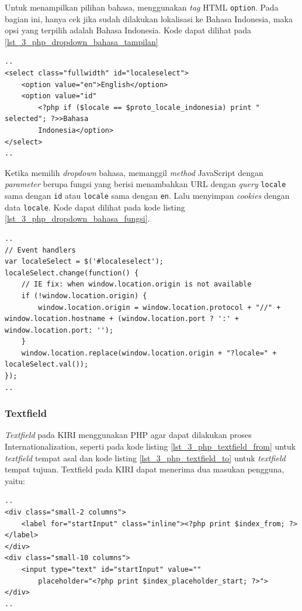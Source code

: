 Untuk menampilkan pilihan bahasa, menggunakan \textit{tag} HTML \verb!option!. Pada bagian ini, hanya cek jika sudah dilakukan lokalisasi ke Bahasa Indonesia, maka opsi yang terpilih adalah Bahasa Indonesia. Kode dapat dilihat pada \ref{lst_3_php_dropdown_bahasa_tampilan}

\begin{lstlisting}[caption=Menampilkan pilihan bahasa kepada pengguna ,label = {lst_3_php_dropdown_bahasa_tampilan}]
..
<select class="fullwidth" id="localeselect">
	<option value="en">English</option>
	<option value="id"
		<?php if ($locale == $proto_locale_indonesia) print " selected"; ?>>Bahasa
		Indonesia</option>
</select>
..
\end{lstlisting}

Ketika memilih \textit{dropdown} bahasa, memanggil \textit{method} JavaScript dengan \textit{parameter} berupa fungsi yang berisi menambahkan URL dengan \textit{query} \verb!locale! sama dengan \verb!id! atau \verb!locale! sama dengan \verb!en!. Lalu menyimpan \textit{cookies} dengan data \verb!locale!. Kode dapat dilihat pada kode listing \ref{lst_3_php_dropdown_bahasa_fungsi}.

\begin{lstlisting}[caption=Fungsi JavaScript untuk Internationalization ,label = {lst_3_php_dropdown_bahasa_fungsi}]
..
// Event handlers
var localeSelect = $('#localeselect');
localeSelect.change(function() {
	// IE fix: when window.location.origin is not available 
	if (!window.location.origin) {
		window.location.origin = window.location.protocol + "//" + window.location.hostname + (window.location.port ? ':' + window.location.port: '');
	}
	window.location.replace(window.location.origin + "?locale=" + localeSelect.val());
});
..
\end{lstlisting}


\subsubsection{Textfield}
\textit{Textfield} pada KIRI menggunakan PHP agar dapat dilakukan proses Internationalization, seperti pada kode listing \ref{lst_3_php_textfield_from} untuk \textit{textfield} tempat asal dan kode listing \ref{lst_3_php_textfield_to} untuk \textit{textfield} tempat tujuan. Textfield pada KIRI dapat menerima dua masukan pengguna, yaitu:

\begin{lstlisting}[caption=Menampilkan \textit{textfield} tempat awal kepada pengguna ,label = {lst_3_php_textfield_from}]
..
<div class="small-2 columns">
	<label for="startInput" class="inline"><?php print $index_from; ?></label>
</div>
<div class="small-10 columns">
	<input type="text" id="startInput" value=""
		placeholder="<?php print $index_placeholder_start; ?>">
</div>
..
\end{lstlisting}

